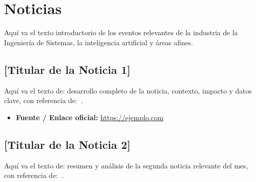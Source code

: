 \documentclass[conference]{IEEEtran}
\begin{document}
\section{Noticias}

Aquí va el texto introductorio de los eventos relevantes de la industria de la
Ingeniería de Sistemas, la inteligencia artificial y áreas afines.

\subsection{[Titular de la Noticia 1]}

Aquí va el texto de: desarrollo completo de la noticia, contexto, impacto y
datos clave, con referencia de:~\cite{ejemplo_referencia}.

\begin{itemize}
  \item \textbf{Fuente / Enlace oficial:} \url{https://ejemplo.com}
\end{itemize}

\subsection{[Titular de la Noticia 2]}

Aquí va el texto de: resumen y análisis de la segunda noticia relevante del
mes, con referencia de:~\cite{ejemplo_referencia}.



\end{document}
